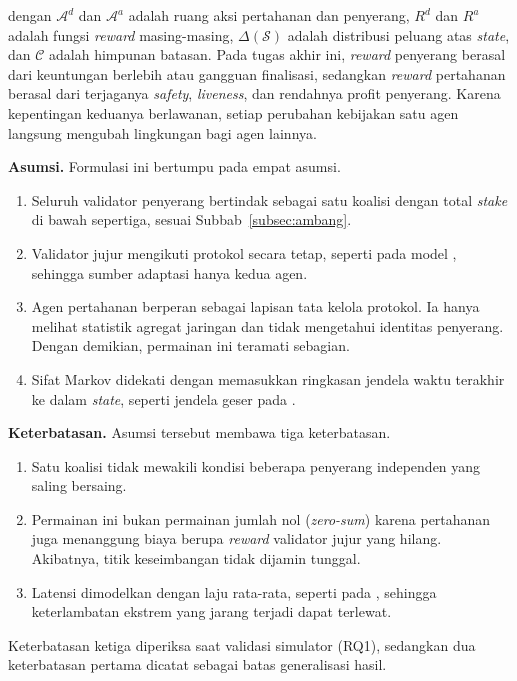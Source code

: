 \noindent dengan $\mathcal{A}^{d}$ dan $\mathcal{A}^{a}$ adalah ruang aksi pertahanan dan penyerang, $R^{d}$ dan $R^{a}$ adalah fungsi \textit{reward} masing-masing, $\Delta(\mathcal{S})$ adalah distribusi peluang atas \textit{state}, dan $\mathcal{C}$ adalah himpunan batasan. Pada tugas akhir ini, \textit{reward} penyerang berasal dari keuntungan berlebih atau gangguan finalisasi, sedangkan \textit{reward} pertahanan berasal dari terjaganya \textit{safety}, \textit{liveness}, dan rendahnya profit penyerang. Karena kepentingan keduanya berlawanan, setiap perubahan kebijakan satu agen langsung mengubah lingkungan bagi agen lainnya.

\textbf{Asumsi.} Formulasi ini bertumpu pada empat asumsi.
\begin{enumerate}
	\item Seluruh validator penyerang bertindak sebagai satu koalisi dengan total \textit{stake} di bawah sepertiga, sesuai Subbab~\ref{subsec:ambang}.
	\item Validator jujur mengikuti protokol secara tetap, seperti pada model \textcite{laneve2025stochastic}, sehingga sumber adaptasi hanya kedua agen.
	\item Agen pertahanan berperan sebagai lapisan tata kelola protokol. Ia hanya melihat statistik agregat jaringan dan tidak mengetahui identitas penyerang. Dengan demikian, permainan ini teramati sebagian.
	\item Sifat Markov didekati dengan memasukkan ringkasan jendela waktu terakhir ke dalam \textit{state}, seperti jendela geser pada \textcite{skowronski2026adaptive}.
\end{enumerate}

\textbf{Keterbatasan.} Asumsi tersebut membawa tiga keterbatasan.
\begin{enumerate}
	\item Satu koalisi tidak mewakili kondisi beberapa penyerang independen yang saling bersaing.
	\item Permainan ini bukan permainan jumlah nol (\textit{zero-sum}) karena pertahanan juga menanggung biaya berupa \textit{reward} validator jujur yang hilang. Akibatnya, titik keseimbangan tidak dijamin tunggal.
	\item Latensi dimodelkan dengan laju rata-rata, seperti pada \textcite{laneve2025stochastic}, sehingga keterlambatan ekstrem yang jarang terjadi dapat terlewat.
\end{enumerate}
Keterbatasan ketiga diperiksa saat validasi simulator (RQ1), sedangkan dua keterbatasan pertama dicatat sebagai batas generalisasi hasil.

